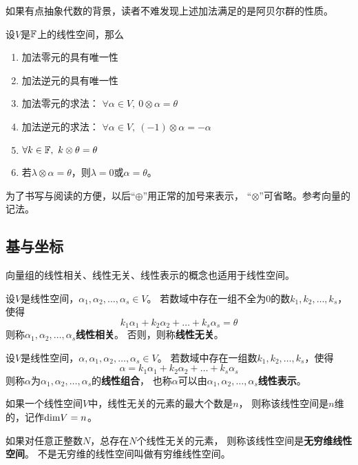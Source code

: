 \begin{remark}
  如果有点抽象代数的背景，读者不难发现上述加法满足的是阿贝尔群的性质。
\end{remark}

\begin{theorem}[线性空间的性质]
  设$V$是$\mathbb{F}$上的线性空间，那么
  \begin{enumerate}
    \item 加法零元的具有唯一性
    \item 加法逆元的具有唯一性
    \item 加法零元的求法：
    $\forall\alpha\in V,\ 0\otimes\alpha=\theta$
    \item 加法逆元的求法：
    $\forall\alpha\in V,\ (-1)\otimes\alpha=-\alpha$
    \item $\forall k\in\mfF,\ k\otimes\theta=\theta$
    \item 若$\lambda\otimes\alpha=\theta$，则$\lambda=0$或$\alpha=\theta$。
  \end{enumerate}
\end{theorem}
为了书写与阅读的方便，以后``$\oplus$''用正常的加号来表示，
``$\otimes$''可省略。参考向量的记法。

\subsection{基与坐标}
向量组的线性相关、线性无关、线性表示的概念也适用于线性空间。

\begin{definition}[线性相关与线性无关]
  设$V$是线性空间，$\alpha_1,\alpha_2,\dots,\alpha_s\in V$。
  若数域中存在一组不全为0的数$k_1,k_2,\dots,k_s$，使得
  \[ k_1\alpha_1 + k_2\alpha_2 + \dots + k_s\alpha_s = \theta \]
  则称$\alpha_1,\alpha_2,\dots,\alpha_s$\textbf{线性相关}。
  否则，则称\textbf{线性无关}。
\end{definition}

\begin{definition}[线性表示]
  设$V$是线性空间，$\alpha,\alpha_1,\alpha_2,\dots,\alpha_s\in V$。
  若数域中存在一组数$k_1,k_2,\dots,k_s$，使得
  \[ \alpha = k_1\alpha_1 + k_2\alpha_2 + \dots + k_s\alpha_s \]
  则称$\alpha$为$\alpha_1,\alpha_2,\dots,\alpha_s$的\textbf{线性组合}，
  也称$\alpha$可以由$\alpha_1,\alpha_2,\dots,\alpha_s$\textbf{线性表示}。
\end{definition}

\begin{definition}[维数]
  如果一个线性空间$V$中，线性无关的元素的最大个数是$n$，
  则称该线性空间是$n$维的，记作$\textrm{dim} V = n$。
  
  如果对任意正整数$N$，总存在$N$个线性无关的元素，
  则称该线性空间是\textbf{无穷维线性空间}。
  不是无穷维的线性空间叫做有穷维线性空间。
\end{definition}

